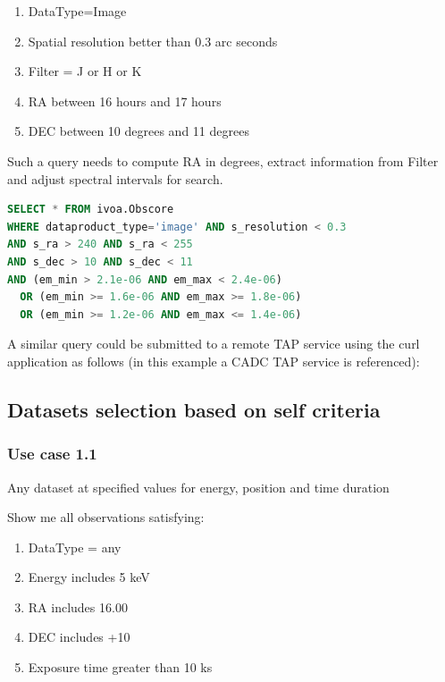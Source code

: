 \documentclass[11pt,a4paper]{ivoa}
\begin{document}
\begin{enumerate}
\item DataType=Image
\item Spatial resolution better than 0.3 arc seconds
\item Filter = J or H or K
\item RA between 16 hours and 17 hours
\item DEC between 10 degrees and 11 degrees
\end{enumerate}
Such a query needs to compute RA in degrees, extract information from Filter and adjust spectral intervals for search.

\begin{lstlisting}[language=SQL,flexiblecolumns=true]
SELECT * FROM ivoa.Obscore
WHERE dataproduct_type='image' AND s_resolution < 0.3
AND s_ra > 240 AND s_ra < 255
AND s_dec > 10 AND s_dec < 11
AND (em_min > 2.1e-06 AND em_max < 2.4e-06)
  OR (em_min >= 1.6e-06 AND em_max >= 1.8e-06)
  OR (em_min >= 1.2e-06 AND em_max <= 1.4e-06)
\end{lstlisting}

A similar query could be submitted to a remote TAP service using the curl application as follows (in this example a CADC
TAP service is referenced):


\subsection{Datasets selection based on self criteria}
\subsubsection{Use case 1.1}
Any dataset at specified values for energy, position and time duration

Show me all observations satisfying:

\begin{enumerate}
\item DataType = any
\item Energy includes 5 keV
\item RA includes 16.00
\item DEC includes +10
\item Exposure time greater than 10 ks
\end{enumerate}
\end{document}
